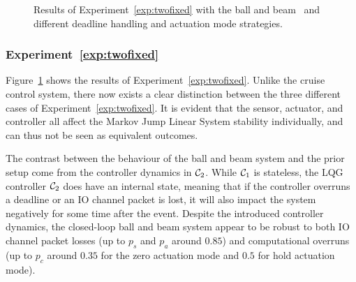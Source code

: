 \begin{figure}[t]
    \caption{Results of Experiment~\ref{exp:twofixed} with the ball and beam~\cite{Vreman:2022} and different deadline handling and actuation mode strategies.}
    \label{fig:nils-fix2}
\end{figure}

\subsubsection*{Experiment~\ref{exp:twofixed}}%
%
Figure~\ref{fig:nils-fix2} shows the results of Experiment~\ref{exp:twofixed}.
Unlike the cruise control system, there now exists a clear distinction between the three different cases of Experiment~\ref{exp:twofixed}.
It is evident that the sensor, actuator, and controller all affect the Markov Jump Linear System stability individually, and can thus not be seen as equivalent outcomes.

The contrast between the behaviour of the ball and beam system and the prior setup come from the controller dynamics in $\mathcal{C}_2$.
While $\mathcal{C}_1$ is stateless, the LQG controller $\mathcal{C}_2$ does have an internal state, meaning that if the controller overruns a deadline or an IO channel packet is lost, it will also impact the system negatively for some time after the event.
Despite the introduced controller dynamics, the closed-loop ball and beam system appear to be robust to both IO channel packet losses (up to $p_s$ and $p_a$ around $0.85$) and computational overruns (up to $p_c$ around $0.35$ for the zero actuation mode and $0.5$ for hold actuation mode).

